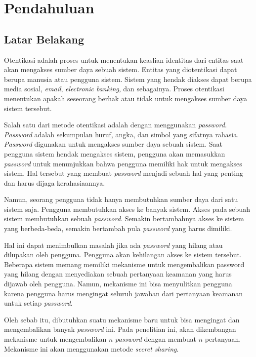 \chapter{Pendahuluan} \label{chap:Pendahuluan}

\section{Latar Belakang}
\label{sec:latarbelakang}

Otentikasi adalah proses untuk menentukan keaslian identitas dari entitas saat akan mengakses sumber daya sebuah sistem. Entitas yang diotentikasi dapat berupa manusia atau pengguna sistem. Sistem yang hendak diakses dapat berupa media sosial, \textit{email}, \textit{electronic banking}, dan sebagainya. Proses otentikasi menentukan apakah seseorang berhak atau tidak untuk mengakses sumber daya sistem tersebut.

Salah satu dari metode otentikasi adalah dengan menggunakan \textit{password}. \textit{Password} adalah sekumpulan huruf, angka, dan simbol yang sifatnya rahasia. \textit{Password} digunakan untuk mengakses sumber daya sebuah sistem. Saat pengguna sistem hendak mengakses sistem, pengguna akan memasukkan \textit{password} untuk menunjukkan bahwa pengguna memiliki hak untuk mengakses sistem.
Hal tersebut yang membuat \textit{password} menjadi sebuah hal yang penting dan harus dijaga kerahasiaannya.

Namun, seorang pengguna tidak hanya membutuhkan sumber daya dari satu sistem saja. Pengguna membutuhkan akses ke banyak sistem. Akses pada sebuah sistem membutuhkan sebuah \textit{password}. Semakin bertambahnya akses ke sistem yang berbeda-beda, semakin bertambah pula \textit{password} yang harus dimiliki.

Hal ini dapat menimbulkan masalah jika ada \textit{password} yang hilang atau dilupakan oleh pengguna. Pengguna akan kehilangan akses ke sistem tersebut. Beberapa sistem memang memiliki mekanisme untuk mengembalikan password yang hilang dengan menyediakan sebuah pertanyaan keamanan yang harus dijawab oleh pengguna. Namun, mekanisme ini bisa menyulitkan pengguna karena pengguna harus mengingat seluruh jawaban dari pertanyaan keamanan untuk setiap \textit{password}.

Oleh sebab itu, dibutuhkan suatu mekanisme baru untuk bisa mengingat dan mengembalikan banyak \textit{password} ini. Pada penelitian ini, akan dikembangan mekanisme untuk mengembalikan $n$ \textit{password} dengan membuat $n$ pertanyaan. Mekanisme ini akan menggunakan metode \textit{secret sharing}.


